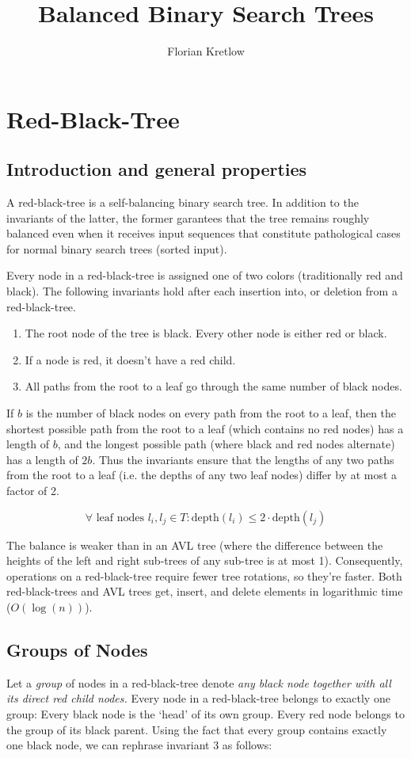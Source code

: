 \documentclass{article}
\title{Balanced Binary Search Trees}
\author{Florian Kretlow}
\begin{document}
\section{Red-Black-Tree}

\subsection{Introduction and general properties}
A red-black-tree is a self-balancing binary search tree. In addition to the invariants
of the latter, the former garantees that the tree remains roughly balanced even when it
receives input sequences that constitute pathological cases for normal binary search
trees (sorted input).

Every node in a red-black-tree is assigned one of two colors (traditionally red and
black). The following invariants hold after each insertion into, or deletion from a
red-black-tree.

\begin{enumerate}[label=(\arabic*)]
\item The root node of the tree is black. Every other node is either red or black.
\item If a node is red, it doesn't have a red child.
\item All paths from the root to a leaf go through the same number of black nodes.
\end{enumerate}

If \(b\) is the number of black nodes on every path from the root to a leaf, then the
shortest possible path from the root to a leaf (which contains no red nodes) has a
length of \(b\), and the longest possible path (where black and red nodes alternate) has
a length of \(2b\).  Thus the invariants ensure that the lengths of any two paths from
the root to a leaf (i.e. the depths of any two leaf nodes) differ by at most a factor of
2.

\[
\forall \text{ leaf nodes } l_{i}, l_{j} \in T : \text{depth}(l_i) \leq 2 \cdot
\text{depth}(l_j)
\]

The balance is weaker than in an AVL tree (where the difference between the heights of
the left and right sub-trees of any sub-tree is at most 1). Consequently, operations on
a red-black-tree require fewer tree rotations, so they’re faster. Both red-black-trees
and AVL trees get, insert, and delete elements in logarithmic time (\(O(\log(n))\)).

\subsection{Groups of Nodes}
Let a \emph{group} of nodes in a red-black-tree denote \emph{any black node together
with all its direct red child nodes.} Every node in a red-black-tree belongs to exactly
one group: Every black node is the ‘head’ of its own group. Every red node belongs
to the group of its black parent. Using the fact that every group contains exactly one
black node, we can rephrase invariant 3 as follows:
\end{document}

